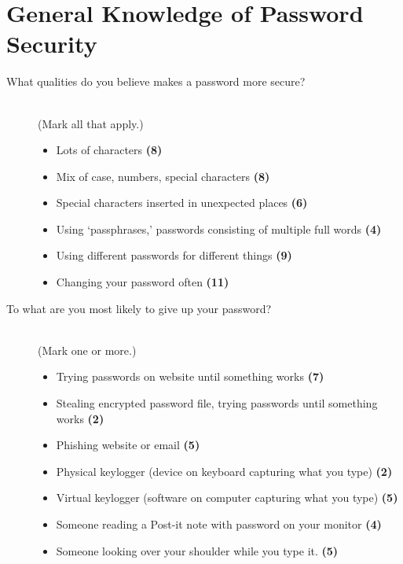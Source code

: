 \documentclass{article}
\begin{document}
  \section{General Knowledge of Password Security}
    \begin{description}
      \item[What qualities do you believe makes a password more secure?]
        \mbox{}\\ {\small (Mark all that apply.)}
        \begin{itemize}
          \renewcommand{\labelitemi}{\scriptsize$\circ$}
          \item Lots of characters \textbf{(8)}
          \item Mix of case, numbers, special characters \textbf{(8)}
          \item Special characters inserted in unexpected places \textbf{(6)}
          \item Using `passphrases,' passwords consisting of multiple full words \textbf{(4)}
          \item Using different passwords for different things \textbf{(9)}
          \item Changing your password often \textbf{(11)}
        \end{itemize}
      \item[To what are you most likely to give up your password?]
        \mbox{}\\ {\small (Mark one or more.)}
        \begin{itemize}
          \renewcommand{\labelitemi}{\scriptsize$\circ$}
          \item Trying passwords on website until something works \textbf{(7)}
          \item Stealing encrypted password file, trying passwords until something works \textbf{(2)}
          \item Phishing website or email \textbf{(5)}
          \item Physical keylogger (device on keyboard capturing what you type) \textbf{(2)}
          \item Virtual keylogger (software on computer capturing what you type) \textbf{(5)}
          \item Someone reading a Post-it note with password on your monitor \textbf{(4)}
          \item Someone looking over your shoulder while you type it. \textbf{(5)}
        \end{itemize}
    \end{description}
\end{document}
